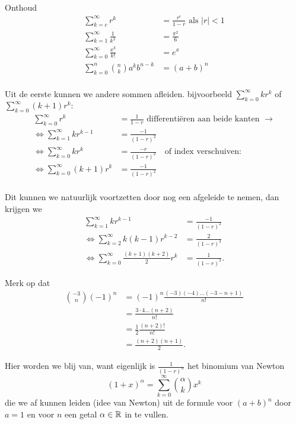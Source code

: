Onthoud
\begin{align*}
    \sum_{k=c}^{\infty} r^k &= \frac{r^c}{1-r} \text{ als $|r|<1$}\\
    \sum_{k=1}^{\infty} \frac{1}{k^2} &= \frac{\pi^2}{6} \\
    \sum_{k=0}^\infty \frac{x^k}{k!} &= e^x \\
    \sum_{k=0}^n \binom{n}{k} a^k b^{n-k} &= (a+b)^n \\
\end{align*}

Uit de eerste kunnen we andere sommen afleiden.
bijvoorbeeld
$\displaystyle \sum_{k=0}^{\infty} kr^k $ of $\displaystyle \sum_{k=0}^{\infty} (k+1)r^k: $
\begin{align*}
    \sum_{k=0}^{\infty} r^k &= \frac{1}{1-r} \text { differenti\"eren aan beide kanten } \to \\
    \iff \sum_{k=1}^{\infty} kr^{k-1} &= \frac{-1}{(1-r)^2} \\
    \iff \sum_{k=0}^{\infty} kr^k &= \frac{-r}{(1-r)^2} \quad \text{of index verschuiven:} \\
    \iff \sum_{k=0}^{\infty} (k+1)r^k &= \frac{-1}{(1-r)^2} \\
\end{align*}

Dit kunnen we natuurlijk voortzetten door nog een afgeleide te nemen, dan krijgen we
\begin{align*}
    \sum_{k=1}^{\infty} kr^{k-1} &= \frac{-1}{(1-r)^2} \\
    \iff \sum_{k=2}^\infty k(k-1) r^{k-2} &= \frac{2}{(1-r)^3} \\
    \iff \sum_{k=0}^\infty \frac{(k+1)(k+2)}{2} r^k &= \frac{1}{(1-r)^3}.
\end{align*}

Merk op dat
\begin{align*}
    \binom{-3}{n} (-1)^n &= (-1)^n \frac{(-3)(-4)\dots (-3-n+1)}{n!} \\
    &= \frac{3 \cdot 4 \dots (n+2)}{n!} \\
    &= \frac{1}{2} \frac{(n+2)!}{n!} \\
    &= \frac{(n+2)(n+1)}{2}.
\end{align*}

Hier worden we blij van, want eigenlijk is $\frac{1}{(1-r)^n} $ het binomium van Newton
\[
    (1+x)^\alpha = \sum_{k=0}^\infty \binom{\alpha}{k} x^k
\]
die we af kunnen leiden (idee van Newton) uit de formule voor $(a+b)^n$ door $a=1$ en voor $n$ een getal $\alpha \in \mathbb{R}$ in te vullen.

